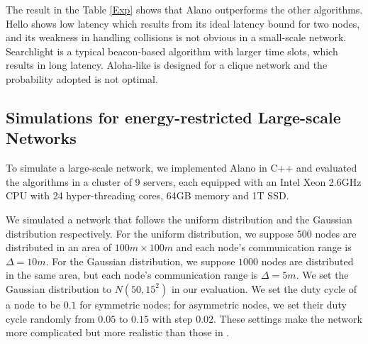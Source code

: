 The result in the Table \ref{Exp} shows that Alano outperforms 
the other algorithms.
Hello shows low latency which results from its ideal latency bound
for two nodes,
and its weakness in handling collisions is not obvious in a small-scale network. 
Searchlight is a typical beacon-based algorithm with larger time slots,
which results in long latency.
Aloha-like is designed for a clique network and the probability adopted is not optimal.


\subsection{Simulations for energy-restricted Large-scale Networks}


To simulate a large-scale network, we implemented Alano in C++ and evaluated the algorithms in a cluster of 9 servers,
each equipped with an Intel Xeon 2.6GHz CPU with 24 hyper-threading cores, 64GB memory and 1T SSD.

We simulated a network that follows the uniform distribution and the
Gaussian distribution respectively.
For the uniform distribution, we suppose $500$ nodes are distributed in an area of $100m \times 100m$ 
and each node's communication range is $\Delta = 10m$. For the Gaussian distribution, we suppose 
$1000$ nodes are distributed in the same area, but each node's communication range is $\Delta = 5m$. 
We set the Gaussian distribution to $N(50,15^2)$ in our evaluation.
We set the duty cycle of a node to be $0.1$ for symmetric nodes; 
for asymmetric nodes, we set their duty cycle randomly from $0.05$ to $0.15$ with step $0.02$.
These settings make the network more complicated but more realistic than
those in
\cite{wang2015blinddate, sun2014hello, bakht2012searchlight,
chen2015heterogeneous, kandhalu2010u, you2011aloha,
mcglynn2001birthday, song2014probabilistic, vasudevan2009neighbor}.


